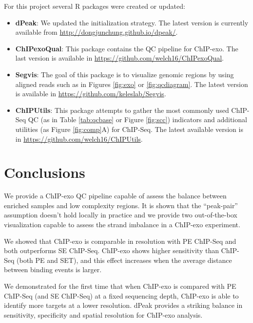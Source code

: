 \documentclass[11pt]{article}\usepackage[]{graphicx}\usepackage[]{color}
\begin{document}
For this project several R packages were created or updated:

\begin{itemize}
\item \textbf{dPeak}: We updated the initialization strategy. The
  latest version is currently available from
  \url{http://dongjunchung.github.io/dpeak/}.
\item \textbf{ChIPexoQual}: This package contains the QC pipeline for
  ChIP-exo. The last version is available in
  \url{https://github.com/welch16/ChIPexoQual}.
\item \textbf{Segvis}: The goal of this package is to visualize
  genomic regions by using aligned reads such as in Figures
  \ref{fig:exo} or \ref{fig:qcdiagram}.  The latest version is
  available in \url{https://github.com/keleslab/Segvis}.
\item \textbf{ChIPUtils}: This package attempts to gather the most
  commonly used ChIP-Seq QC (as in Table \ref{tab:qcbase} or Figure
  \ref{fig:scc}) indicators and additional utilities (as Figure
  \ref{fig:comp}A) for ChIP-Seq. The latest available version is in
  \url{https://github.com/welch16/ChIPUtils}.
\end{itemize}

\section{Conclusions}
\label{sec:conclusions}

We provide a ChIP-exo QC pipeline capable of assess the balance
between enriched samples and low complexity regions. It is shown that
the ``peak-pair'' assumption doesn't hold locally in practice and we
provide two out-of-the-box visualization capable to assess the strand
imbalance in a ChIP-exo experiment.

We showed that ChIP-exo is comparable in resolution with PE ChIP-Seq
and both outperforms SE ChIP-Seq. ChIP-exo shows higher sensitivity
than ChIP-Seq (both PE and SET), and this effect increases when the
average distance between binding events is larger.

We demonstrated for the first time that when ChIP-exo is compared with
PE ChIP-Seq (and SE ChIP-Seq) at a fixed sequencing depth, ChIP-exo is
able to identify more targets at a lower resolution. dPeak provides a
striking balance in sensitivity, specificity and spatial resolution
for ChIP-exo analysis.


\end{document}
